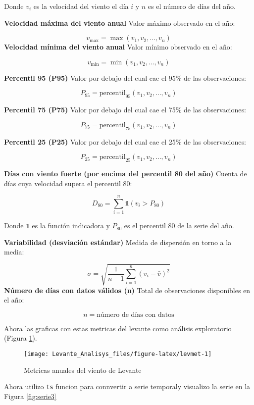 \documentclass[
]{article}
\begin{document}
Donde \(v_i\) es la velocidad del viento el día \(i\) y \(n\) es el número de días del año.

\textbf{Velocidad máxima del viento anual}
Valor máximo observado en el año:

\[
v_{\text{max}} = \max(v_1, v_2, \dots, v_n)
\]
\textbf{Velocidad mínima del viento anual}
Valor mínimo observado en el año:

\[
v_{\text{min}} = \min(v_1, v_2, \dots, v_n)
\]

\textbf{Percentil 95 (P95)}
Valor por debajo del cual cae el 95\% de las observaciones:

\[
P_{95} = \text{percentil}_{95}(v_1, v_2, \dots, v_n)
\]

\textbf{Percentil 75 (P75)}
Valor por debajo del cual cae el 75\% de las observaciones:

\[
P_{75} = \text{percentil}_{75}(v_1, v_2, \dots, v_n)
\]

\textbf{Percentil 25 (P25)}
Valor por debajo del cual cae el 25\% de las observaciones:

\[
P_{25} = \text{percentil}_{25}(v_1, v_2, \dots, v_n)
\]

\textbf{Días con viento fuerte (por encima del percentil 80 del año)}
Cuenta de días cuya velocidad supera el percentil 80:

\[
D_{80} = \sum_{i=1}^{n} \mathbb{1}(v_i > P_{80})
\]

Donde \(\mathbb{1}\) es la función indicadora y \(P_{80}\) es el percentil 80 de la serie del año.

\textbf{Variabilidad (desviación estándar)}
Medida de dispersión en torno a la media:

\[
\sigma = \sqrt{\frac{1}{n - 1} \sum_{i=1}^{n} (v_i - \bar{v})^2}
\]
\textbf{Número de días con datos válidos (n)}
Total de observaciones disponibles en el año:

\[
n = \text{número de días con datos}
\]

Ahora las graficas con estas metricas del levante como análisis exploratorio (Figura \ref{fig:levmet}).

\begin{figure}

{\centering \texttt{[image: Levante\_Analisys\_files/figure-latex/levmet-1]} 

}

\caption{Metricas anuales del viento de Levante}\label{fig:levmet}
\end{figure}

Ahora utilizo \texttt{ts} funcion para connvertir a serie temporaly visualizo la serie en la Figura \ref{fig:serie3}
\end{document}
